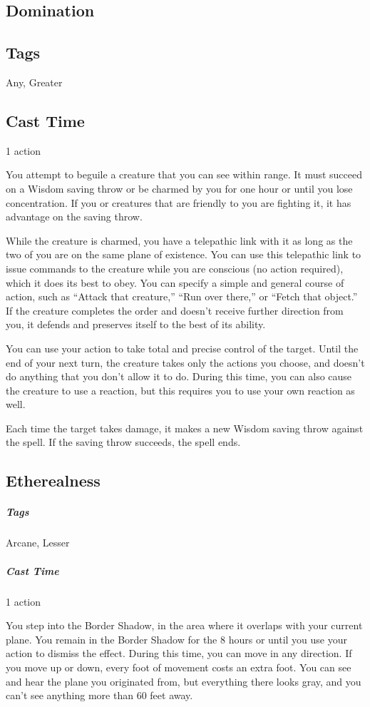 \subsection{Domination\label{spell:domination}}
\subsection*{Tags} Any, Greater
\subsection*{Cast Time} 1 action

You attempt to beguile a creature that you can see within range. It must succeed on a Wisdom saving throw or be charmed by you for one hour or until you lose concentration. If you or creatures that are friendly to you are fighting it, it has advantage on the saving throw.

While the creature is charmed, you have a telepathic link with it as long as the two of you are on the same plane of existence. You can use this telepathic link to issue commands to the creature while you are conscious (no action required), which it does its best to obey. You can specify a simple and general course of action, such as “Attack that creature,” “Run over there,” or “Fetch that object.” If the creature completes the order and doesn’t receive further direction from you, it defends and preserves itself to the best of its ability.

You can use your action to take total and precise control of the target. Until the end of your next turn, the creature takes only the actions you choose, and doesn’t do anything that you don’t allow it to do. During this time, you can also cause the creature to use a reaction, but this requires you to use your own reaction as well.

Each time the target takes damage, it makes a new Wisdom saving throw against the spell. If the saving throw succeeds, the spell ends.

\subsection{Etherealness\label{spell:etherealness}}
\subparagraph*{Tags} Arcane, Lesser
\subparagraph*{Cast Time} 1 action

You step into the Border Shadow, in the area where it overlaps with your current plane. You remain in the Border Shadow for the 8 hours or until you use your action to dismiss the effect. During this time, you can move in any direction. If you move up or down, every foot of movement costs an extra foot. You can see and hear the plane you originated from, but everything there looks gray, and you can’t see anything more than 60 feet away.

